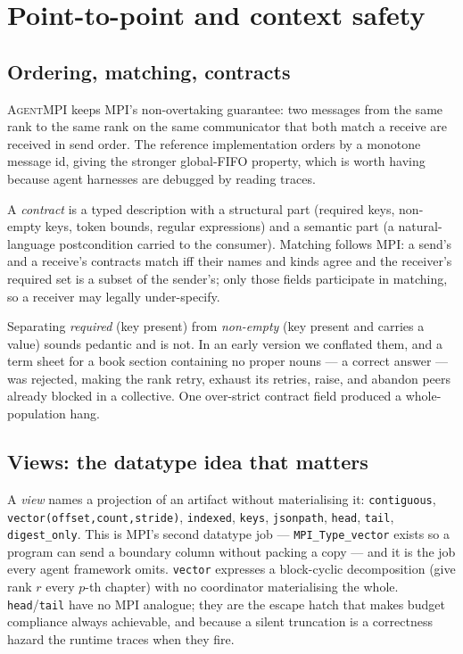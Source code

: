 \documentclass[10pt,twocolumn]{article}
\theoremstyle{definition}
\theoremstyle{plain}
\newcommand{\ampi}{\textsc{AgentMPI}}
\newcommand{\code}[1]{\texttt{\small #1}}
\begin{document}
\section{Point-to-point and context safety}
\label{sec:ptp}

\subsection{Ordering, matching, contracts}

\ampi{} keeps MPI's non-overtaking guarantee: two messages from the same rank to
the same rank on the same communicator that both match a receive are received in
send order. The reference implementation orders by a monotone message id, giving
the stronger global-FIFO property, which is worth having because agent harnesses
are debugged by reading traces.

A \emph{contract} is a typed description with a structural part (required keys,
non-empty keys, token bounds, regular expressions) and a semantic part (a
natural-language postcondition carried to the consumer). Matching follows MPI: a
send's and a receive's contracts match iff their names and kinds agree and the
receiver's required set is a subset of the sender's; only those fields participate
in matching, so a receiver may legally under-specify.

Separating \emph{required} (key present) from \emph{non-empty} (key present and
carries a value) sounds pedantic and is not. In an early version we conflated
them, and a term sheet for a book section containing no proper nouns --- a correct
answer --- was rejected, making the rank retry, exhaust its retries, raise, and
abandon peers already blocked in a collective. One over-strict contract field
produced a whole-population hang.

\subsection{Views: the datatype idea that matters}

A \emph{view} names a projection of an artifact without materialising it:
\code{contiguous}, \code{vector(offset,count,stride)}, \code{indexed},
\code{keys}, \code{jsonpath}, \code{head}, \code{tail}, \code{digest\_only}. This
is MPI's second datatype job --- \code{MPI\_Type\_vector} exists so a program can
send a boundary column without packing a copy --- and it is the job every agent
framework omits. \code{vector} expresses a block-cyclic decomposition (give rank
$r$ every $p$-th chapter) with no coordinator materialising the whole.
\code{head}/\code{tail} have no MPI analogue; they are the escape hatch that makes
budget compliance always achievable, and because a silent truncation is a
correctness hazard the runtime traces when they fire.
\end{document}
